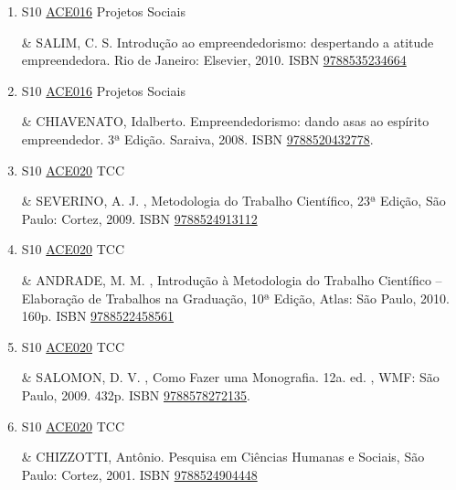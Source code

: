 \documentclass[12pt,a4paper]{book}
\begin{document}
\begin{enumerate}
 \item S10 \hyperref[PUD:ACE016]{ACE016} Projetos Sociais

&   SALIM, C.  S.  Introdução ao empreendedorismo: despertando a atitude empreendedora.  Rio de Janeiro: Elsevier, 2010.  ISBN \href{http://www.bn.br/site/pages/servicosProfissionais/agenciaISBN/isbnBusca/FbnBuscaISBNCatalogo.asp?pField=ISBN&pIntPagina=1&pISBN=35234664&nidbISBN=true&hidbISBN=true}{9788535234664}
 

 \item S10 \hyperref[PUD:ACE016]{ACE016} Projetos Sociais

&   CHIAVENATO, Idalberto.  Empreendedorismo: dando asas ao espírito empreendedor.  3ª Edição.  Saraiva, 2008.  ISBN \href{http://www.bn.br/site/pages/servicosProfissionais/agenciaISBN/isbnBusca/FbnBuscaISBNCatalogo.asp?pField=ISBN&pIntPagina=1&pISBN=20432778&nidbISBN=true&hidbISBN=true}{9788520432778}.
 \item S10 \hyperref[PUD:ACE020]{ACE020} TCC

& SEVERINO, A.  J. , Metodologia do Trabalho Científico, 23ª Edição, São Paulo: Cortez, 2009.  ISBN \href{http://www.bn.br/site/pages/servicosProfissionais/agenciaISBN/isbnBusca/FbnBuscaISBNCatalogo.asp?pField=ISBN&pIntPagina=1&pISBN=24913112&nidbISBN=true&hidbISBN=true}{9788524913112}
 

 \item S10 \hyperref[PUD:ACE020]{ACE020} TCC

&  ANDRADE, M.  M. , Introdução à Metodologia do Trabalho Científico – Elaboração de Trabalhos na Graduação, 10ª Edição, Atlas: São Paulo, 2010.  160p.  ISBN \href{http://www.bn.br/site/pages/servicosProfissionais/agenciaISBN/isbnBusca/FbnBuscaISBNCatalogo.asp?pField=ISBN&pIntPagina=1&pISBN=22458561&nidbISBN=true&hidbISBN=true}{9788522458561}
 

 \item S10 \hyperref[PUD:ACE020]{ACE020} TCC

&  SALOMON, D.  V. , Como Fazer uma Monografia.  12a.  ed. , WMF: São Paulo, 2009.  432p.   ISBN \href{http://www.bn.br/site/pages/servicosProfissionais/agenciaISBN/isbnBusca/FbnBuscaISBNCatalogo.asp?pField=ISBN&pIntPagina=1&pISBN=78272135&nidbISBN=true&hidbISBN=true}{9788578272135}.
 \item S10 \hyperref[PUD:ACE020]{ACE020} TCC

& CHIZZOTTI, Antônio.  Pesquisa em Ciências Humanas e Sociais, São Paulo: Cortez, 2001.  ISBN \href{http://www.bn.br/site/pages/servicosProfissionais/agenciaISBN/isbnBusca/FbnBuscaISBNCatalogo.asp?pField=ISBN&pIntPagina=1&pISBN=24904448&nidbISBN=true&hidbISBN=true}{9788524904448}
 


\end{enumerate}
\end{document}
